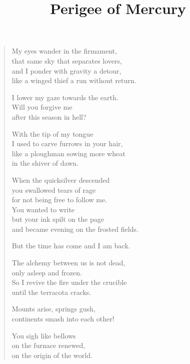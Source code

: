 \documentclass[twocolumn,11pt]{article}
\title{Perigee of Mercury}
\author{}
\date{}
\begin{document}
\maketitle

\thispagestyle{empty}



\bigskip

\begin{verse}%
  My eyes wander in the firmament, \\
  that same sky that separates lovers, \\
  and I ponder with gravity a detour, \\
  like a winged thief a run without return.

  I lower my gaze towards the earth. \\
  Will you forgive me \\
  after this season in hell?

  With the tip of my tongue \\
  I used to carve furrows in your hair, \\
  like a ploughman sowing more wheat \\
  in the shiver of dawn.

  When the quicksilver descended \\
  you swallowed tears of rage \\
  for not being free to follow me. \\
  You wanted to write \\
  but your ink spilt on the page \\
  and became evening on the frosted fields.

  But the time has come and I am back.

  The alchemy between us is not dead, \\
  only asleep and frozen. \\
  So I revive the fire under the crucible \\
  until the terracota cracks.

  \newpage

  Mounts arise, springs gush, \\
  continents smash into each other!

  You sigh like bellows \\
  on the furnace renewed, \\
  on the origin of the world.


\end{verse}
\end{document}
